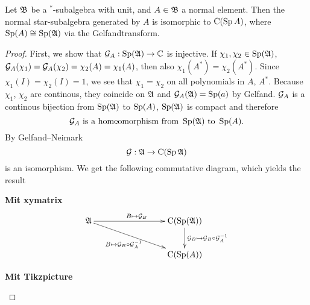 \begin{prop}
 Let $\mathfrak{B}$ be a $^*$-subalgebra with unit, and $A \in \mathfrak{B}$ a normal element. Then the normal star-subalgebra generated by $A$ is isomorphic to $\operatorname{C} (\operatorname{Sp} A)$, where $\operatorname{Sp}(A) \cong \operatorname{Sp}(\mathfrak{A})$ via the Gelfandtransform.
\end{prop}

\begin{proof}
 First, we show that $\mathcal{G}_A : \operatorname{Sp}(\mathfrak{A}) \to \mathbb{C}$ is injective. If $\chi_1 , \chi_2 \in \operatorname{Sp}(\mathfrak{A})$, $\mathcal{G}_A(\chi_1) = \mathcal{G}_A(\chi_2)=\chi_2(A)=\chi_1(A)$, then also $\chi_1(A^*)=\chi_2(A^*)$. Since $\chi_1(I)=\chi_2(I)=1$, we see that $\chi_1 = \chi_2$ on all polynomials in $A$, $A^*$. Because $\chi_1$, $\chi_2$ are continous, they coincide on $\mathfrak{A}$ and $\mathcal{G}_A(\mathfrak{A})=\operatorname{Sp}(a)$ by Gelfand. $\mathcal{G}_A$ is a continous bijection from $\operatorname{Sp}(\mathfrak{A})$ to $\operatorname{Sp}(A)$, $\operatorname{Sp}(\mathfrak{A})$ is compact and therefore
\[
 \mathcal{G}_A \text{ is a homeomorphism from } \operatorname{Sp}(\mathfrak{A}) \text{ to } \operatorname{Sp}(A).
\]
By Gelfand--Neimark 
\[
 \mathcal{G} : \mathfrak{A} \to \operatorname{C}(\operatorname{Sp} \mathfrak{A})
\]
is an isomorphism. We get the following commutative diagram, which yields the result

\textbf{Mit xymatrix}
\[
\xymatrix{
 \A \ar[rrr]^{{B \mapsto \G_B}} \ar[drrr]_{B \mapsto \G_B \circ \G_A \inv~~~} &&& \cf(\spe(\A)) \ar[d]^{\G_B \mapsto \G_B \circ \G_A \inv} \\
   &&&  \cf(\spe(A))}
\]


 
\textbf{Mit Tikzpicture}

\begin{center}
 \end{center}

 \begin{center}
 \end{center}

 




\end{proof}

